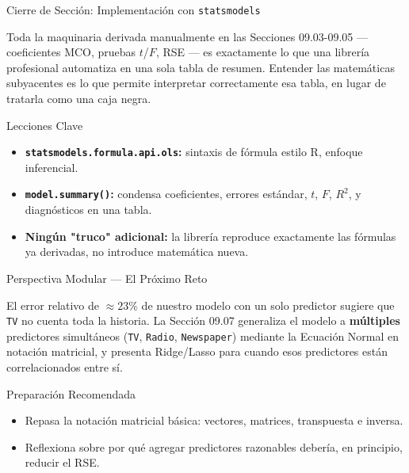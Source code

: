 \documentclass[10pt, aspectratio=169]{beamer}
\begin{document}
\begin{frame}{Cierre de Sección: Implementación con \texttt{statsmodels}}
  \begin{reflexion}
    Toda la maquinaria derivada manualmente en las Secciones 09.03-09.05 --- coeficientes MCO, pruebas $t$/$F$, RSE --- es exactamente lo que una librería profesional automatiza en una sola tabla de resumen. Entender las matemáticas subyacentes es lo que permite interpretar correctamente esa tabla, en lugar de tratarla como una caja negra.
  \end{reflexion}

  \vspace{0.2cm}
  \pause
  \begin{block}{Lecciones Clave}
    \begin{itemize}\itemsep=0.08cm
      \item \textbf{\texttt{statsmodels.formula.api.ols}:} sintaxis de fórmula estilo R, enfoque inferencial.
      \item \textbf{\texttt{model.summary()}:} condensa coeficientes, errores estándar, $t$, $F$, $R^2$, y diagnósticos en una tabla.
      \item \textbf{Ningún "truco" adicional:} la librería reproduce exactamente las fórmulas ya derivadas, no introduce matemática nueva.
    \end{itemize}
  \end{block}
\end{frame}

\begin{frame}{Perspectiva Modular --- El Próximo Reto}
  \scriptsize
  \begin{retoclase}
    El error relativo de $\approx23\%$ de nuestro modelo con un solo predictor sugiere que \texttt{TV} no cuenta toda la historia. La Sección 09.07 generaliza el modelo a \textbf{múltiples} predictores simultáneos (\texttt{TV}, \texttt{Radio}, \texttt{Newspaper}) mediante la Ecuación Normal en notación matricial, y presenta Ridge/Lasso para cuando esos predictores están correlacionados entre sí.
  \end{retoclase}

  \vspace{0.08cm}
  \pause
  \begin{alertblock}{Preparación Recomendada}
    \begin{itemize}\itemsep=0.06cm
      \item Repasa la notación matricial básica: vectores, matrices, transpuesta e inversa.
      \item Reflexiona sobre por qué agregar predictores razonables debería, en principio, reducir el RSE.
    \end{itemize}
  \end{alertblock}
\end{frame}
\end{document}
